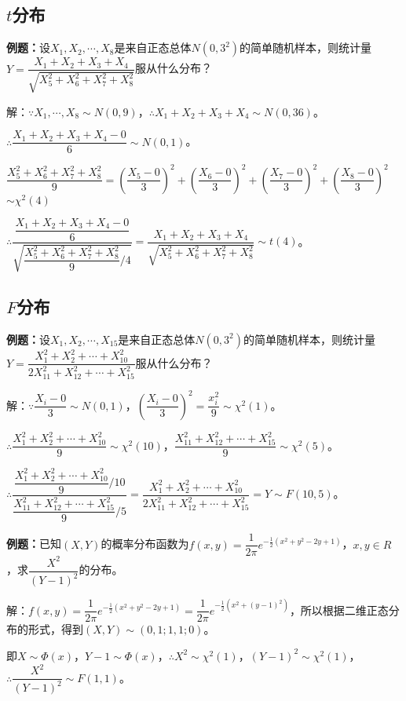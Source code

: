 \documentclass[UTF8, 12pt]{ctexart}
\begin{document}
\subsection{\texorpdfstring{$t$分布}{}}

\textbf{例题：}设$X_1,X_2,\cdots,X_8$是来自正态总体$N(0,3^2)$的简单随机样本，则统计量$Y=\dfrac{X_1+X_2+X_3+X_4}{\sqrt{X_5^2+X_6^2+X_7^2+X_8^2}}$服从什么分布？

解：$\because X_1,\cdots,X_8\sim N(0,9)$，$\therefore X_1+X_2+X_3+X_4\sim N(0,36)$。

$\therefore\dfrac{X_1+X_2+X_3+X_4-0}{6}\sim N(0,1)$。

$\dfrac{X_5^2+X_6^2+X_7^2+X_8^2}{9}=\left(\dfrac{X_5-0}{3}\right)^2+\left(\dfrac{X_6-0}{3}\right)^2+\left(\dfrac{X_7-0}{3}\right)^2+\left(\dfrac{X_8-0}{3}\right)^2$\\$\sim\chi^2(4)$

$\therefore\dfrac{\dfrac{X_1+X_2+X_3+X_4-0}{6}}{\sqrt{\dfrac{X_5^2+X_6^2+X_7^2+X_8^2}{9}/4}}=\dfrac{X_1+X_2+X_3+X_4}{\sqrt{X_5^2+X_6^2+X_7^2+X_8^2}}\sim t(4)$。

\subsection{\texorpdfstring{$F$分布}{}}

\textbf{例题：}设$X_1,X_2,\cdots,X_15$是来自正态总体$N(0,3^2)$的简单随机样本，则统计量$Y=\dfrac{X_1^2+X_2^2+\cdots+X_{10}^2}{2X_{11}^2+X_{12}^2+\cdots+X_{15}^2}$服从什么分布？

解：$\because\dfrac{X_i-0}{3}\sim N(0,1)$，$\left(\dfrac{X_i-0}{3}\right)^2=\dfrac{x_i^2}{9}\sim\chi^2(1)$。

$\therefore\dfrac{X_1^2+X_2^2+\cdots+X_{10}^2}{9}\sim\chi^2(10)$，$\dfrac{X_{11}^2+X_{12}^2+\cdots+X_{15}^2}{9}\sim\chi^2(5)$。

$\therefore\dfrac{\dfrac{X_1^2+X_2^2+\cdots+X_{10}^2}{9}/10}{\dfrac{X_{11}^2+X_{12}^2+\cdots+X_{15}^2}{9}/5}=\dfrac{X_1^2+X_2^2+\cdots+X_{10}^2}{2X_{11}^2+X_{12}^2+\cdots+X_{15}^2}=Y\sim F(10,5)$。

\textbf{例题：}已知$(X,Y)$的概率分布函数为$f(x,y)=\dfrac{1}{2\pi}e^{-\frac{1}{2}(x^2+y^2-2y+1)}$，$x,y\in R$，求$\dfrac{X^2}{(Y-1)^2}$的分布。

解：$f(x,y)=\dfrac{1}{2\pi}e^{-\frac{1}{2}(x^2+y^2-2y+1)}=\dfrac{1}{2\pi}e^{-\frac{1}{2}(x^2+(y-1)^2)}$，所以根据二维正态分布的形式，得到$(X,Y)\sim(0,1;1,1;0)$。

即$X\sim\varPhi(x)$，$Y-1\sim\varPhi(x)$，$\therefore X^2\sim\chi^2(1)$，$(Y-1)^2\sim\chi^2(1)$，$\therefore\dfrac{X^2}{(Y-1)^2}\sim F(1,1)$。
\end{document}
